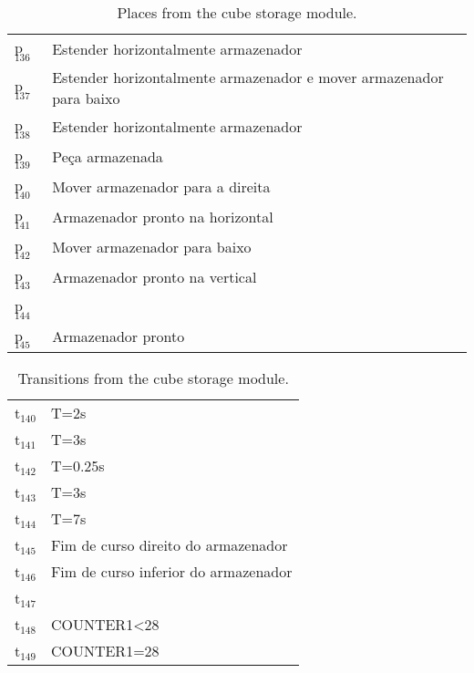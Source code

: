 \begin{table}[htbp]
\caption{Places from the cube storage module.}
\centering
\begin{tabular}{ll}
p\(_{\text{136}}\) & Estender horizontalmente armazenador\\
p\(_{\text{137}}\) & Estender horizontalmente armazenador e mover armazenador para baixo\\
p\(_{\text{138}}\) & Estender horizontalmente armazenador\\
p\(_{\text{139}}\) & Peça armazenada\\
p\(_{\text{140}}\) & Mover armazenador para a direita\\
p\(_{\text{141}}\) & Armazenador pronto na horizontal\\
p\(_{\text{142}}\) & Mover armazenador para baixo\\
p\(_{\text{143}}\) & Armazenador pronto na vertical\\
p\(_{\text{144}}\) & \\
p\(_{\text{145}}\) & Armazenador pronto\\
\end{tabular}
\end{table}

\begin{table}[htbp]
\caption{Transitions from the cube storage module.}
\centering
\begin{tabular}{ll}
t\(_{\text{140}}\) & T=2s\\
t\(_{\text{141}}\) & T=3s\\
t\(_{\text{142}}\) & T=0.25s\\
t\(_{\text{143}}\) & T=3s\\
t\(_{\text{144}}\) & T=7s\\
t\(_{\text{145}}\) & Fim de curso direito do armazenador\\
t\(_{\text{146}}\) & Fim de curso inferior do armazenador\\
t\(_{\text{147}}\) & \\
t\(_{\text{148}}\) & COUNTER1<28\\
t\(_{\text{149}}\) & COUNTER1=28\\
\end{tabular}
\end{table}
